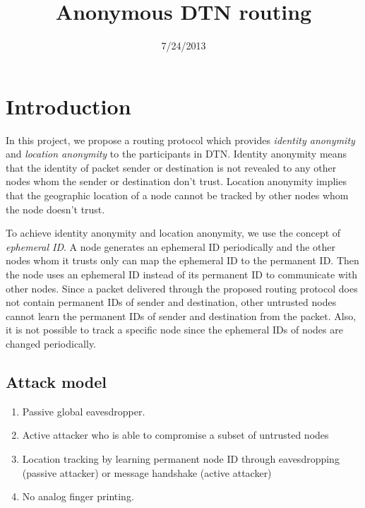 \documentclass[11pt]{article}
\begin{document}
\title{Anonymous DTN routing}
\date{7/24/2013}
\maketitle

\section{Introduction}
In this project, we propose a routing protocol which provides \textit{identity anonymity} and \textit{location anonymity} to the participants in DTN.  Identity anonymity means that the identity of packet sender or destination is not revealed to any other nodes whom the sender or destination don't trust.  Location anonymity implies that the geographic location of a node cannot be tracked by other nodes whom the node doesn't trust.  

To achieve identity anonymity and location anonymity, we use the concept of \textit{ephemeral ID}.  A node generates an ephemeral ID periodically and the other nodes whom it trusts only can map the ephemeral ID to the permanent ID.  Then the node uses an ephemeral ID instead of its permanent ID to communicate with other nodes.  Since a packet delivered through the proposed routing protocol does not contain permanent IDs of sender and destination, other untrusted nodes cannot learn the permanent IDs of sender and destination from the packet.  Also, it is not possible to track a specific node since the ephemeral IDs of nodes are changed periodically. 


\subsection{Attack model}
\begin{enumerate}
\item Passive global eavesdropper.
\item Active attacker who is able to compromise a subset of untrusted nodes
\item Location tracking by learning permanent node ID through eavesdropping (passive attacker) or message handshake (active attacker)
\item No analog finger printing.
\end{enumerate}
\end{document}
